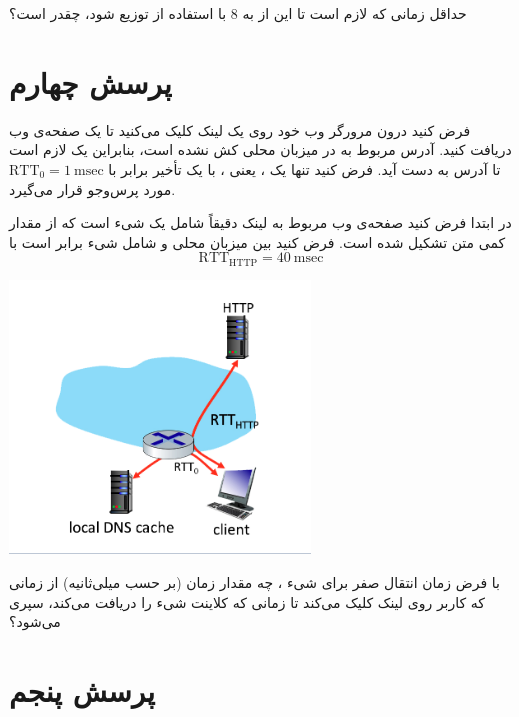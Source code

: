 حداقل زمانی که لازم است تا این  از  به 8  با استفاده از  
 توزیع شود، چقدر است؟

\section*{پرسش چهارم}
فرض کنید درون مرورگر وب خود روی یک لینک کلیک می‌کنید تا یک صفحه‌ی وب دریافت کنید. 
آدرس  مربوط به  در میزبان محلی کش نشده است، بنابراین یک  لازم است تا آدرس  به دست آید. 
فرض کنید تنها یک ، یعنی ، با یک  تأخیر برابر با
 \(\mathrm{RTT}_{0} = 1~\mathrm{msec}\) مورد پرس‌وجو قرار می‌گیرد. 

در ابتدا فرض کنید صفحه‌ی وب مربوط به لینک دقیقاً شامل یک شیء است که از مقدار کمی متن  تشکیل شده است. 
فرض کنید  بین میزبان محلی و  شامل شیء برابر است با
\[
\mathrm{RTT}_{\text{HTTP}} = 40~\mathrm{msec}
\]

\begin{center}
\includegraphics[width=0.6\textwidth]{images/image4.png}
\end{center}
















با فرض زمان انتقال صفر برای شیء ، چه مقدار زمان (بر حسب میلی‌ثانیه) از زمانی که کاربر روی لینک کلیک می‌کند تا زمانی که کلاینت شیء را دریافت می‌کند، سپری می‌شود؟

\section*{پرسش پنجم}

